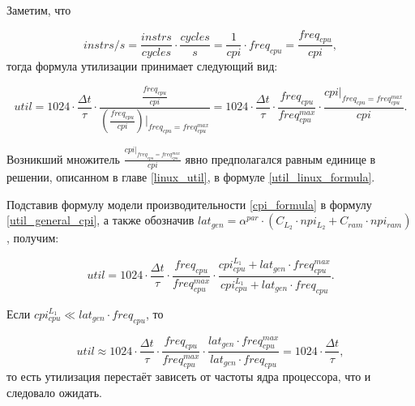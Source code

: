 
    Заметим, что

    \begin{equation}
        instrs / s = \frac{instrs}{cycles} \cdot \frac{cycles}{s} = \frac{1}{cpi} \cdot freq_{cpu} =
        \frac{freq_{cpu}}{cpi},
    \end{equation}
    тогда формула утилизации принимает следующий вид:

    \begin{equation} \label{util_general_cpi}
        util = 1024 \cdot \frac{\Delta t}{\tau} \cdot \frac{\frac{freq_{cpu}}{cpi}}{\left( \frac{freq_{cpu}}{cpi} \right)
            \bigg|_{freq_{cpu} = freq_{cpu}^{max}}} = 1024 \cdot \frac{\Delta t}{\tau} \cdot
            \frac{freq_{cpu}}{freq_{cpu}^{max}} \cdot \frac{cpi |_{freq_{cpu} = freq_{cpu}^{max}}}{cpi}.
    \end{equation}

    Возникший множитель $\frac{cpi |_{freq_{cpu} = freq_{cpu}^{max}}}{cpi}$ явно предполагался равным единице
    в решении, описанном в главе \ref{linux_util}, в формуле \eqref{util_linux_formula}.

    Подставив формулу модели производительности \eqref{cpi_formula} в формулу \eqref{util_general_cpi},
    а также обозначив $lat_{gen} = \alpha^{par} \cdot \left( C_{L_2} \cdot npi_{L_2} + C_{ram} \cdot npi_{ram} \right)$,
    получим:

    \begin{equation} \label{util_formula_final}
        util = 1024 \cdot \frac{\Delta t}{\tau} \cdot \frac{freq_{cpu}}{freq_{cpu}^{max}} \cdot
            \frac{cpi_{cpu}^{L_1} + lat_{gen} \cdot freq_{cpu}^{max}}
                 {cpi_{cpu}^{L_1} + lat_{gen} \cdot freq_{cpu}}.
    \end{equation}

    Если $cpi_{cpu}^{L_1} \ll lat_{gen} \cdot freq_{cpu}$, то

    \begin{equation}
        util \approx 1024 \cdot \frac{\Delta t}{\tau} \cdot \frac{freq_{cpu}}{freq_{cpu}^{max}} \cdot
            \frac{lat_{gen} \cdot freq_{cpu}^{max}} {lat_{gen} \cdot freq_{cpu}} =
            1024 \cdot \frac{\Delta t}{\tau},
    \end{equation}
    то есть утилизация перестаёт зависеть от частоты ядра процессора,
    что и следовало ожидать.

